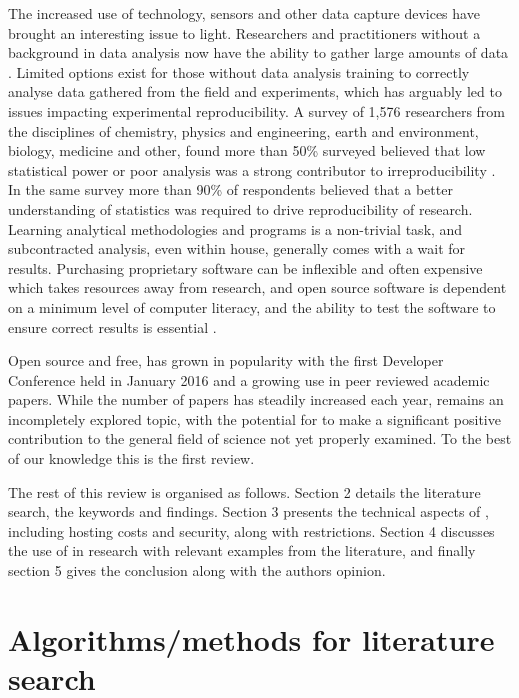The increased use of technology, sensors and other data capture devices have brought an interesting issue to light. Researchers and practitioners without a background in data analysis now have the ability to gather large amounts of data \citep{lazerte_feedr_2017}.  Limited options exist for those without data analysis training to correctly analyse data gathered from the field and experiments, which has arguably led to issues impacting experimental reproducibility.  A  survey of 1,576 researchers from the disciplines of chemistry, physics and engineering, earth and environment, biology, medicine and other, found more than 50\% surveyed believed that low statistical power or poor analysis was a strong contributor to irreproducibility \citep{baker_1500_2016}.  In the same survey more than 90\% of respondents believed that a better understanding of statistics was required to drive reproducibility of research.  Learning analytical methodologies and programs is a non-trivial task, and subcontracted analysis, even within house, generally comes with a wait for results.  Purchasing proprietary software can be inflexible and often expensive which takes resources away from research, and open source software is dependent on a minimum level of computer literacy, and the ability to test the software to ensure correct results is essential \citep{lazerte_feedr_2017}.

Open source and free,  has grown in popularity with the first  Developer Conference held in January 2016 and a growing use in peer reviewed academic papers.  While the number of papers has steadily increased each year,  remains an incompletely explored topic, with the potential for  to make a significant positive contribution to the general field of science not yet properly examined.  To the best of our knowledge this is the first  review.

The rest of this review is organised as follows.  Section 2 details the literature search, the keywords and findings.  Section 3 presents the technical aspects of , including hosting costs and security, along with restrictions.  Section 4 discusses the use of  in research with relevant examples from the literature, and finally section 5 gives the conclusion along with the authors opinion.

\section{Algorithms/methods for literature search}

